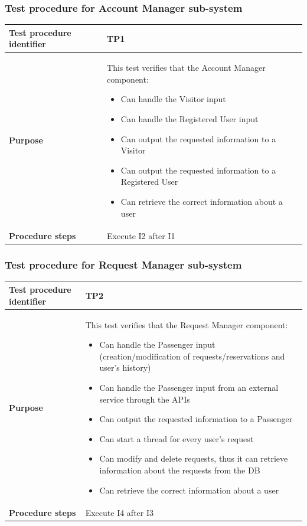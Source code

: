 \documentclass[a4paper,11pt]{report} %
\begin{document}
			\subsubsection{Test procedure for Account Manager sub-system} \label{sec:3.2.1}
				\begin{center}
					\begin{tabular}{| l | p{10cm} |}\hline
						\textbf{Test procedure identifier} & TP1\\\hline
						\textbf{Purpose} & This test verifies that the Account Manager component: \begin{itemize}
							\item Can handle the Visitor input
							\item Can handle the Registered User input
							\item Can output the requested information to a Visitor
							\item Can output the requested information to a Registered User
							\item Can retrieve the correct information about a user
						\end{itemize}\\\hline
						\textbf{Procedure steps} & Execute I2 after I1 \\\hline
					\end{tabular}
				\end{center}	
		\pagebreak				
			\subsubsection{Test procedure for Request Manager sub-system} \label{sec:3.2.2}
				\begin{center}
					\begin{tabular}{| l | p{10cm} |}\hline
						\textbf{Test procedure identifier} & TP2\\\hline
						\textbf{Purpose} & This test verifies that the Request Manager component: \begin{itemize}
							\item Can handle the Passenger input (creation/modification of requests/reservations and user's history)
							\item Can handle the Passenger input from an external service through the APIs
							\item Can output the requested information to a Passenger
							\item Can start a thread for every user's request
							\item Can modify and delete requests, thus it can retrieve information about the requests from the DB
							\item Can retrieve the correct information about a user
						\end{itemize}\\\hline
						\textbf{Procedure steps} & Execute I4 after I3 \\\hline
					\end{tabular}
				\end{center}	
			\bigskip	
\end{document}
